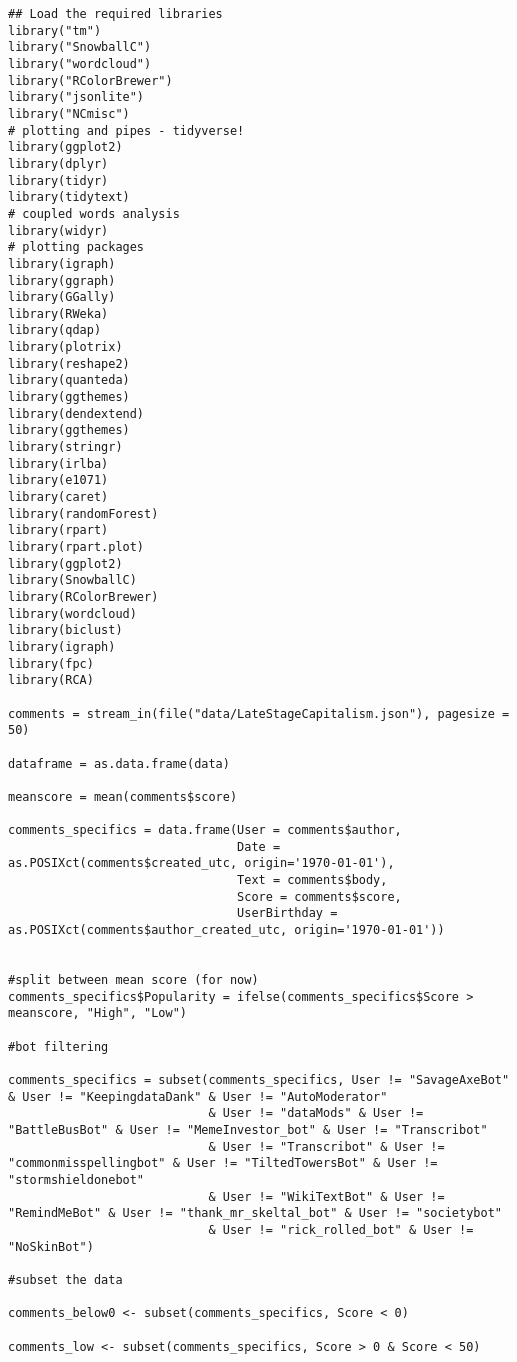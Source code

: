 \begin{lstlisting}
## Load the required libraries
library("tm")
library("SnowballC")
library("wordcloud")
library("RColorBrewer")
library("jsonlite")
library("NCmisc")
# plotting and pipes - tidyverse!
library(ggplot2)
library(dplyr)
library(tidyr)
library(tidytext)
# coupled words analysis
library(widyr)
# plotting packages
library(igraph)
library(ggraph)
library(GGally)
library(RWeka)
library(qdap)
library(plotrix)
library(reshape2)
library(quanteda)
library(ggthemes)
library(dendextend)
library(ggthemes)
library(stringr)
library(irlba)
library(e1071)
library(caret)
library(randomForest)
library(rpart)
library(rpart.plot)
library(ggplot2)
library(SnowballC)
library(RColorBrewer)
library(wordcloud)
library(biclust)
library(igraph)
library(fpc)
library(RCA)

comments = stream_in(file("data/LateStageCapitalism.json"), pagesize = 50)

dataframe = as.data.frame(data)

meanscore = mean(comments$score)

comments_specifics = data.frame(User = comments$author,
                                Date = as.POSIXct(comments$created_utc, origin='1970-01-01'),
                                Text = comments$body,
                                Score = comments$score,
                                UserBirthday = as.POSIXct(comments$author_created_utc, origin='1970-01-01'))


#split between mean score (for now)
comments_specifics$Popularity = ifelse(comments_specifics$Score > meanscore, "High", "Low")

#bot filtering

comments_specifics = subset(comments_specifics, User != "SavageAxeBot" & User != "KeepingdataDank" & User != "AutoModerator" 
                            & User != "dataMods" & User != "BattleBusBot" & User != "MemeInvestor_bot" & User != "Transcribot"
                            & User != "Transcribot" & User != "commonmisspellingbot" & User != "TiltedTowersBot" & User != "stormshieldonebot"
                            & User != "WikiTextBot" & User != "RemindMeBot" & User != "thank_mr_skeltal_bot" & User != "societybot"
                            & User != "rick_rolled_bot" & User != "NoSkinBot")

#subset the data

comments_below0 <- subset(comments_specifics, Score < 0)

comments_low <- subset(comments_specifics, Score > 0 & Score < 50)


\end{lstlisting}
